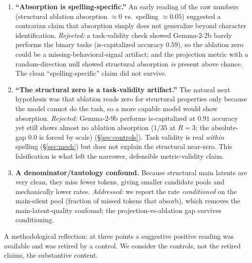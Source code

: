 \documentclass[11pt]{article}
\newcommand{\iscap}{\textsf{is-capitalized}}
\theoremstyle{definition}
\begin{document}
\begin{enumerate}[leftmargin=1.4em,itemsep=3pt]
  \item \textbf{``Absorption is spelling-specific.''} An early reading of the raw numbers (structural
  ablation absorption $\approx 0$ vs.\ spelling $\approx 0.05$) suggested a contrarian claim that absorption
  simply does not generalize beyond character identification. \emph{Rejected:} a task-validity check showed
  Gemma-2-2b barely performs the binary tasks (\iscap{} accuracy $0.59$), so the ablation zero could be a
  missing-behavioral-signal artifact; and the projection metric with a random-direction null showed
  structural absorption \emph{is} present above chance. The clean ``spelling-specific'' claim did not survive.
  \item \textbf{``The structural zero is a task-validity artifact.''} The natural next hypothesis was that
  ablation reads zero for structural properties only because the model cannot do the task, so a more capable
  model would show absorption. \emph{Rejected:} Gemma-2-9b performs \iscap{} at $0.91$ accuracy yet still
  shows almost no ablation absorption ($1/35$ at $R{=}3$; the absolute-gap $0.0$ is forced by scale)
  (\S\ref{sec:controls}). Task validity is real \emph{within} spelling (\S\ref{sec:mech}) but does not explain the
  structural near-zero. This falsification is what left the narrower, defensible metric-validity claim.
  \item \textbf{A denominator/tautology confound.} Because structural main latents are very clean, they miss
  fewer tokens, giving smaller candidate pools and mechanically lower rates. \emph{Addressed:} we report the
  rate \emph{conditioned} on the main-silent pool (fraction of missed tokens that absorb), which removes the
  main-latent-quality confound; the projection-vs-ablation gap survives conditioning.
\end{enumerate}
A methodological reflection: at three points a suggestive positive reading was available and was retired by a
control. We consider the controls, not the retired claims, the substantive content.

\small


\end{document}
